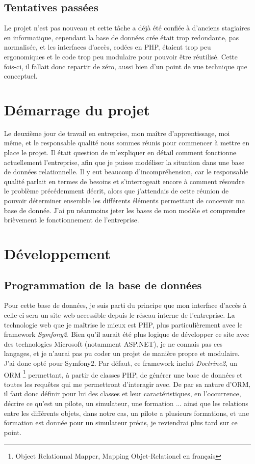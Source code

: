 \documentclass[a4paper,french,11pt,openany,oneside]{memoir}
\begin{document}
\subsection{Tentatives passées}

Le projet n'est pas nouveau et cette tâche a déjà été confiée à d'anciens stagiaires en informatique, cependant la base de données crée était trop redondante, pas normalisée, et les interfaces d'accès, codées en PHP, étaient trop peu ergonomiques et le code trop peu modulaire pour pouvoir être réutilisé. Cette fois-ci, il fallait donc repartir de zéro, aussi bien d'un point de vue technique que conceptuel.


\section{Démarrage du projet}

Le deuxième jour de travail en entreprise, mon maître d'apprentissage, moi même, et le responsable qualité nous sommes réunis pour commencer à mettre en place le projet. Il était question de m'expliquer en détail comment fonctionne actuellement l'entreprise, afin que je puisse modéliser la situation dans une base de données relationnelle. Il y eut beaucoup d'incompréhension, car le responsable qualité parlait en termes de besoins et s'interrogeait encore à comment résoudre le problème précédemment décrit, alors que j'attendais de cette réunion de pouvoir déterminer ensemble les différents éléments permettant de concevoir ma base de donnée. J'ai pu néanmoins jeter les bases de mon modèle et comprendre brièvement le fonctionnement de l'entreprise.

\section{Développement}

\subsection{Programmation de la base de données}

Pour cette base de données, je suis parti du principe que mon interface d'accès à celle-ci sera un site web accessible depuis le réseau interne de l'entreprise. La technologie web que je maîtrise le mieux est PHP, plus particulièrement avec le framework \emph{Symfony2}. Bien qu'il aurait été plus logique de développer ce site avec des technologies Microsoft (notamment ASP.NET), je ne connais pas ces langages, et je n'aurai pas pu coder un projet de manière propre et modulaire. J'ai donc opté pour Symfony2. Par défaut, ce framework inclut \emph{Doctrine2}, un ORM \footnote{Object Relationnal Mapper, Mapping Objet-Relationel en français} permettant, à partir de classes PHP, de générer une base de données et toutes les requêtes qui me permettront d'interagir avec. De par sa nature d'ORM, il faut donc définir pour lui des classes et leur caractéristiques, en l'occurrence, décrire ce qu'est un pilote, un simulateur, une formation ... ainsi que les relations entre les différents objets, dans notre cas, un pilote a plusieurs formations, et une formation est donnée pour un simulateur précis, je reviendrai plus tard sur ce point.
\end{document}
